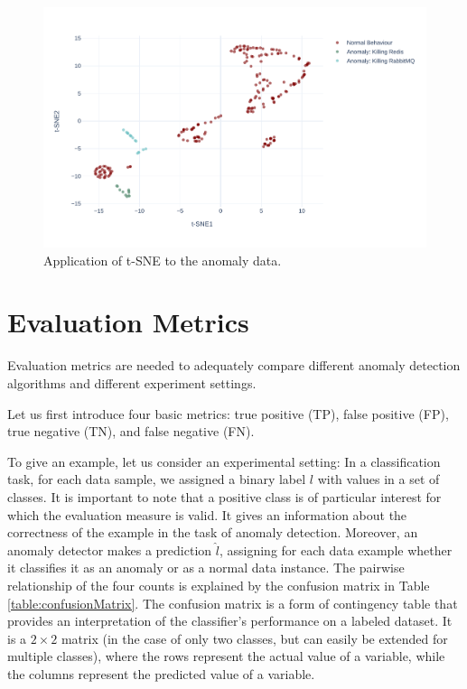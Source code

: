 \begin{figure}[!h]
    \centering
    \includegraphics[width=\textwidth]{img/tsne-anomalies-vs-normal.pdf}
    \caption{Application of t-SNE to the anomaly data.}
    \label{fig:tsne-anomalies}
\end{figure}

\section{Evaluation Metrics}
\label{section:evaluationMetrics}
Evaluation metrics are needed to adequately compare different anomaly detection algorithms and different experiment settings.

Let us first introduce four basic metrics: true positive (TP), false positive (FP), true negative (TN), and false negative (FN).

To give an example, let us consider an experimental setting: In a classification task, for each data sample, we assigned a binary label $l$ with values in a set of classes. It is important to note that a positive class is of particular interest for which the evaluation measure is valid. It gives an information about the correctness of the example in the task of anomaly detection. Moreover, an anomaly detector makes a prediction $\hat{l}$, assigning for each data example whether it classifies it as an anomaly or as a normal data instance. The pairwise relationship of the four counts is explained by the confusion matrix in Table \ref{table:confusionMatrix}. The confusion matrix is a form of contingency table that provides an interpretation of the classifier's performance on a labeled dataset. It is a $2 \times 2$ matrix (in the case of only two classes, but can easily be extended for multiple classes), where the rows represent the actual value of a variable, while the columns represent the predicted value of a variable.

